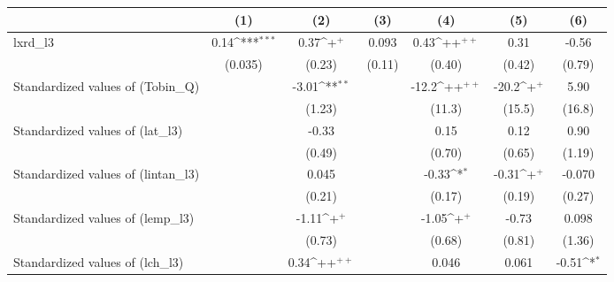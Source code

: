 {
\def\sym#1{\ifmmode^{#1}\else\(^{#1}\)\fi}
\begin{tabular}{l*{6}{c}}
\toprule
                    &\multicolumn{1}{c}{(1)}         &\multicolumn{1}{c}{(2)}         &\multicolumn{1}{c}{(3)}         &\multicolumn{1}{c}{(4)}         &\multicolumn{1}{c}{(5)}         &\multicolumn{1}{c}{(6)}         \\
\midrule
lxrd\_l3             &        0.14\sym{***}&        0.37\sym{+}  &       0.093         &        0.43\sym{++} &        0.31         &       -0.56         \\
                    &     (0.035)         &      (0.23)         &      (0.11)         &      (0.40)         &      (0.42)         &      (0.79)         \\
\addlinespace
Standardized values of (Tobin\_Q)     &                     &       -3.01\sym{**} &                     &       -12.2\sym{++} &       -20.2\sym{+}  &        5.90         \\
                    &                     &      (1.23)         &                     &      (11.3)         &      (15.5)         &      (16.8)         \\
\addlinespace
Standardized values of (lat\_l3)     &                     &       -0.33         &                     &        0.15         &        0.12         &        0.90         \\
                    &                     &      (0.49)         &                     &      (0.70)         &      (0.65)         &      (1.19)         \\
\addlinespace
Standardized values of (lintan\_l3)     &                     &       0.045         &                     &       -0.33\sym{*}  &       -0.31\sym{+}  &      -0.070         \\
                    &                     &      (0.21)         &                     &      (0.17)         &      (0.19)         &      (0.27)         \\
\addlinespace
Standardized values of (lemp\_l3)     &                     &       -1.11\sym{+}  &                     &       -1.05\sym{+}  &       -0.73         &       0.098         \\
                    &                     &      (0.73)         &                     &      (0.68)         &      (0.81)         &      (1.36)         \\
\addlinespace
Standardized values of (lch\_l3)     &                     &        0.34\sym{++} &                     &       0.046         &       0.061         &       -0.51\sym{*}  \\

\end{tabular}}
